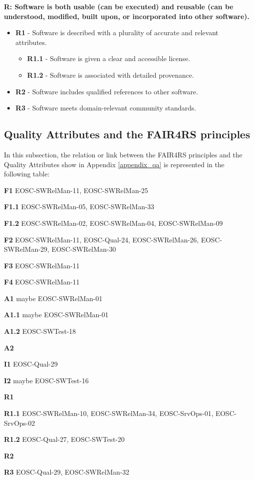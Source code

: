 \textbf{R: Software is both usable (can be executed) and reusable (can be understood, modified, built
upon, or incorporated into other software).}

\begin{itemize}
    \item \textbf{R1} - Software is described with a plurality of accurate and relevant attributes.

    \begin{itemize}
        \item \textbf{R1.1} - Software is given a clear and accessible license.
        \item \textbf{R1.2} - Software is associated with detailed provenance.
    \end{itemize}

    \item \textbf{R2} - Software includes qualified references to other software.
    \item \textbf{R3} - Software meets domain-relevant community standards.
\end{itemize}

\subsection{Quality Attributes and the FAIR4RS principles}

In this subsection, the relation or link between the FAIR4RS principles and the Quality Attributes
show in Appendix \ref{appendix_qa} is represented in the following table:

\textbf{F1} EOSC-SWRelMan-11, EOSC-SWRelMan-25

\textbf{F1.1} EOSC-SWRelMan-05, EOSC-SWRelMan-33

\textbf{F1.2} EOSC-SWRelMan-02, EOSC-SWRelMan-04, EOSC-SWRelMan-09

\textbf{F2} EOSC-SWRelMan-11, EOSC-Qual-24, EOSC-SWRelMan-26, EOSC-SWRelMan-29, EOSC-SWRelMan-30

\textbf{F3} EOSC-SWRelMan-11

\textbf{F4} EOSC-SWRelMan-11


\textbf{A1} maybe EOSC-SWRelMan-01

\textbf{A1.1} maybe EOSC-SWRelMan-01

\textbf{A1.2} EOSC-SWTest-18

\textbf{A2}

\textbf{I1} EOSC-Qual-29

\textbf{I2} maybe EOSC-SWTest-16

\textbf{R1}

\textbf{R1.1} EOSC-SWRelMan-10, EOSC-SWRelMan-34, EOSC-SrvOps-01, EOSC-SrvOps-02

\textbf{R1.2} EOSC-Qual-27, EOSC-SWTest-20

\textbf{R2}

\textbf{R3} EOSC-Qual-29, EOSC-SWRelMan-32



